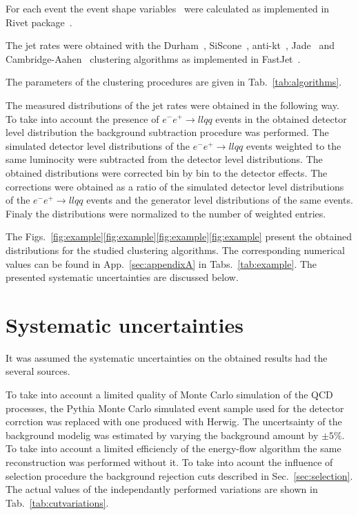 For each event the event shape variables~\cite{OPAL:2011aa} 
were calculated  as  implemented in Rivet package~\cite{Buckley:2010ar}.

The jet rates were obtained with the Durham~\cite{Catani:1991hj}, SiScone~\cite{Cacciari:2005hq}, anti-kt~\cite{Cacciari:2008gp}, Jade~\cite{Bartel:1986ua}
  and Cambridge-Aahen~\cite{Dokshitzer:1997in}
clustering algorithms as implemented in FastJet~\cite{Cacciari:2011ma}.

The parameters of the clustering procedures are given in Tab.~\ref{tab:algorithms}.
\TABalgorithms

The measured distributions of the jet rates were obtained in the following way.
To take into account the presence of $e^-e^+ \rightarrow llqq$ events in the 
obtained detector level distribution the background subtraction procedure was performed.
The simulated detector level distributions of the $e^-e^+ \rightarrow llqq$ events 
weighted to the same luminocity were subtracted from the detector level distributions.
The obtained distributions were corrected bin by bin to the detector effects. 
The corrections were obtained as a ratio of 
the simulated detector level distributions of the $e^-e^+ \rightarrow llqq$ events 
and the generator level distributions of the same events.
Finaly the distributions were normalized to the number of weighted entries.

The Figs.~\ref{fig:example}\ref{fig:example}\ref{fig:example}\ref{fig:example}
present the obtained distributions for the studied clustering algorithms.
\FIGexample
\FIGexample
\FIGexample
\FIGexample
The corresponding numerical values can be found in App.~\ref{sec:appendixA}
in Tabs.~\ref{tab:example}. The  presented systematic uncertainties are discussed below.


\section{Systematic uncertainties}
\label{sec:systematic}
It was assumed the
 systematic uncertainties on the obtained results 
 had the several sources.

 To take into account a limited quality of Monte Carlo simulation of the
 QCD processes, the Pythia Monte Carlo simulated event sample used for the detector
 corrction was replaced with one produced with Herwig.
 The uncertsainty of the background modelig was estimated by varying the 
 background amount by $\pm5\%$.
To take into account a limited efficiencly of the energy-flow 
algorithm the same reconstruction was performed without it.
 To take into acount the influence of selection procedure
the background rejection cuts described in Sec.~\ref{sec:selection}. %
 The actual values of the independantly performed variations are shown in Tab.~\ref{tab:cutvariations}.
 \TABcutvariations
 
